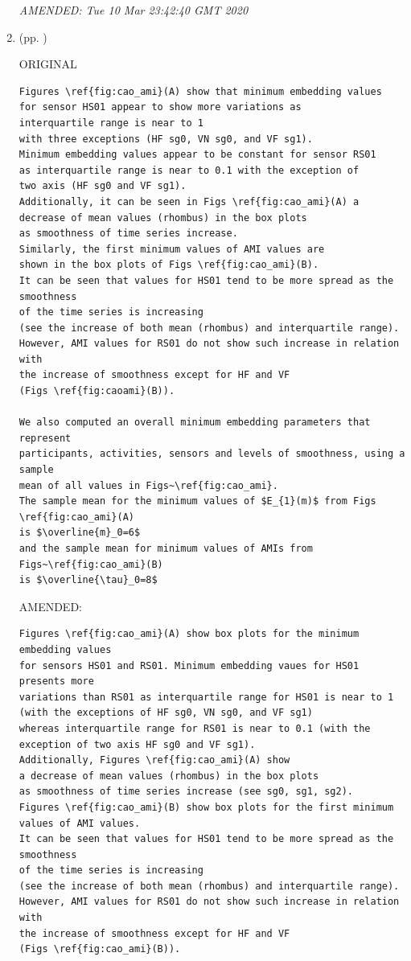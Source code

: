 \documentclass[10pt]{article}
\begin{document}
\begin{enumerate}
\begin{verbatim}
\end{verbatim}
	\textit{
	AMENDED: 
Tue 10 Mar 23:42:40 GMT 2020
	}
	\\




\item  (pp. ) 

ORIGINAL
\begin{verbatim}
Figures \ref{fig:cao_ami}(A) show that minimum embedding values 
for sensor HS01 appear to show more variations as 
interquartile range is near to 1 
with three exceptions (HF sg0, VN sg0, and VF sg1).
Minimum embedding values appear to be constant for sensor RS01 
as interquartile range is near to 0.1 with the exception of 
two axis (HF sg0 and VF sg1).
Additionally, it can be seen in Figs \ref{fig:cao_ami}(A) a 
decrease of mean values (rhombus) in the box plots
as smoothness of time series increase.
Similarly, the first minimum values of AMI values are 
shown in the box plots of Figs \ref{fig:cao_ami}(B).
It can be seen that values for HS01 tend to be more spread as the smoothness 
of the time series is increasing 
(see the increase of both mean (rhombus) and interquartile range).
However, AMI values for RS01 do not show such increase in relation with
the increase of smoothness except for HF and VF
(Figs \ref{fig:caoami}(B)).

We also computed an overall minimum embedding parameters that represent 
participants, activities, sensors and levels of smoothness, using a sample 
mean of all values in Figs~\ref{fig:cao_ami}.
The sample mean for the minimum values of $E_{1}(m)$ from Figs \ref{fig:cao_ami}(A) 
is $\overline{m}_0=6$ 
and the sample mean for minimum values of AMIs from Figs~\ref{fig:cao_ami}(B)
is $\overline{\tau}_0=8$
\end{verbatim}
	

AMENDED:
\begin{verbatim}
Figures \ref{fig:cao_ami}(A) show box plots for the minimum embedding values 
for sensors HS01 and RS01. Minimum embedding vaues for HS01 presents more 
variations than RS01 as interquartile range for HS01 is near to 1 (with the exceptions of HF sg0, VN sg0, and VF sg1)
whereas interquartile range for RS01 is near to 0.1 (with the exception of two axis HF sg0 and VF sg1).
Additionally, Figures \ref{fig:cao_ami}(A) show
a decrease of mean values (rhombus) in the box plots
as smoothness of time series increase (see sg0, sg1, sg2).
Figures \ref{fig:cao_ami}(B) show box plots for the first minimum values of AMI values.
It can be seen that values for HS01 tend to be more spread as the smoothness 
of the time series is increasing 
(see the increase of both mean (rhombus) and interquartile range).
However, AMI values for RS01 do not show such increase in relation with
the increase of smoothness except for HF and VF
(Figs \ref{fig:cao_ami}(B)).


\end{verbatim}
\end{enumerate}
\end{document}
